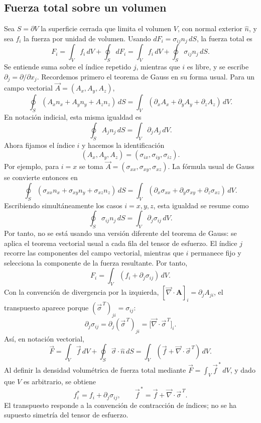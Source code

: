 \subsection{Fuerza total sobre un volumen}

Sea $S=\partial V$ la superficie cerrada que limita el volumen $V$, con normal exterior $\hat n$, y sea $f_i$ la fuerza por unidad de volumen. Usando $dF_i=\sigma_{ij}n_j\,dS$, la fuerza total es
\[
F_i=\int_V f_i\,dV+\oint_S dF_i
=\int_V f_i\,dV+\oint_S\sigma_{ij}n_j\,dS.
\]
Se entiende suma sobre el índice repetido $j$, mientras que $i$ es libre, y se escribe $\partial_j=\partial/\partial x_j$. Recordemos primero el teorema de Gauss en su forma usual. Para un campo vectorial $\vec A=(A_x,A_y,A_z)$,
\[
\oint_S
(A_xn_x+A_yn_y+A_zn_z)\,dS
=\int_V
(\partial_xA_x+\partial_yA_y+\partial_zA_z)\,dV.
\]
En notación indicial, esta misma igualdad es
\[
\oint_S A_jn_j\,dS=\int_V\partial_jA_j\,dV.
\]
Ahora fijamos el índice $i$ y hacemos la identificación
\[
(A_x,A_y,A_z)=(\sigma_{ix},\sigma_{iy},\sigma_{iz}).
\]
Por ejemplo, para $i=x$ se toma $\vec A=(\sigma_{xx},\sigma_{xy},\sigma_{xz})$. La fórmula usual de Gauss se convierte entonces en
\[
\oint_S
(\sigma_{xx}n_x+\sigma_{xy}n_y+\sigma_{xz}n_z)\,dS
=\int_V
(\partial_x\sigma_{xx}+\partial_y\sigma_{xy}+\partial_z\sigma_{xz})\,dV.
\]
Escribiendo simultáneamente los casos $i=x,y,z$, esta igualdad se resume como
\[
\boxed{\oint_S\sigma_{ij}n_j\,dS
=\int_V\partial_j\sigma_{ij}\,dV}.
\]
Por tanto, no se está usando una versión diferente del teorema de Gauss: se aplica el teorema vectorial usual a cada fila del tensor de esfuerzo. El índice $j$ recorre las componentes del campo vectorial, mientras que $i$ permanece fijo y selecciona la componente de la fuerza resultante.
Por tanto,
\[
F_i=\int_V\left(f_i+\partial_j\sigma_{ij}\right)\,dV.
\]
Con la convención de divergencia por la izquierda,
$[\vec\nabla\cdot\mathbf A]_i=\partial_j A_{ji}$,
el transpuesto aparece porque $(\vec\sigma^{\,T})_{ji}=\sigma_{ij}$:
\[
\partial_j\sigma_{ij}
=\partial_j(\vec\sigma^{\,T})_{ji}
=\bigl[\vec\nabla\cdot\vec\sigma^{\,T}\bigr]_i.
\]
Así, en notación vectorial,
\[
\vec F=\int_V\vec f\,dV+\oint_S\vec\sigma\cdot\hat n\,dS
=\int_V\left(\vec f+\vec\nabla\cdot\vec\sigma^{\,T}\right)\,dV.
\]
Al definir la densidad volumétrica de fuerza total mediante
$\vec F=\int_V\vec f^{\,*}\,dV$, y dado que $V$ es arbitrario, se obtiene
\[
\boxed{f_i^*=f_i+\partial_j\sigma_{ij}},
\qquad
\boxed{\vec f^{\,*}=\vec f+\vec\nabla\cdot\vec\sigma^{\,T}.}
\]
El transpuesto responde a la convención de contracción de índices; no se ha supuesto simetría del tensor de esfuerzo.

